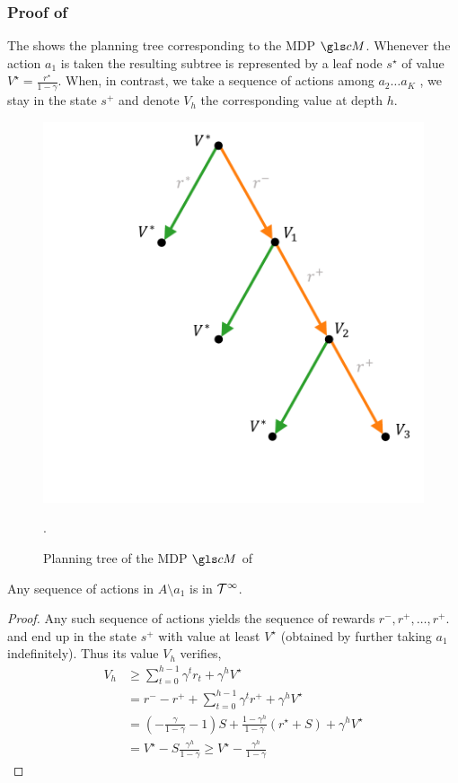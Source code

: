 \begin{subappendices}
\subsubsection{Proof of }

The  shows the planning tree corresponding to the MDP $\cM$. Whenever the action $a_1$ is taken  the resulting subtree is represented by a leaf node $s^\star$ of value $V^\star = \frac{r^\star}{1-\gamma}$. When, in contrast, we take a sequence of actions among $a_2\dots a_K$ , we stay in the state $s^+$ and denote $V_h$ the corresponding value at depth $h$.

\begin{figure}
    \centering
    \includegraphics[trim={3.5cm 2cm 0.5cm 0.5cm}, clip, width=0.5\linewidth]{img/gbop/mdp_tree.pdf}
    \caption{Planning tree of the \gls{MDP} $\cM$ of }.
    \label{fig:mdp-tree}
\end{figure}
\begin{lemma}
	\begin{leftbar}[lemmabar]
 Any sequence of actions in $A\setminus{a_1}$ is in $\mathcal{T}^\infty$.
 \end{leftbar}
\end{lemma}
\begin{proof}
Any such sequence of actions yields the sequence of rewards $r^-, r^+, \dots,r^+$. and end up in the state $s^+$ with value at least $V^\star$ (obtained by further taking $a_1$ indefinitely). Thus its value $V_h$ verifies, 
\begin{align*}
    V_h &\geq \sum_{t=0}^{h-1} \gamma^t r_t + \gamma^h V^\star\\
    &= r^- - r^+ + \sum_{t=0}^{h-1} \gamma^t r^+ + \gamma^h V^\star \\
    &= (-\frac{\gamma}{1-\gamma} - 1)S + \frac{1-\gamma^h}{1-\gamma} (r^\star + S) + \gamma^h V^\star\\
    &= V^\star - S\frac{\gamma^h}{1-\gamma} \geq V^\star - \frac{\gamma^h}{1-\gamma}
\end{align*}
\end{proof}


\end{subappendices}
